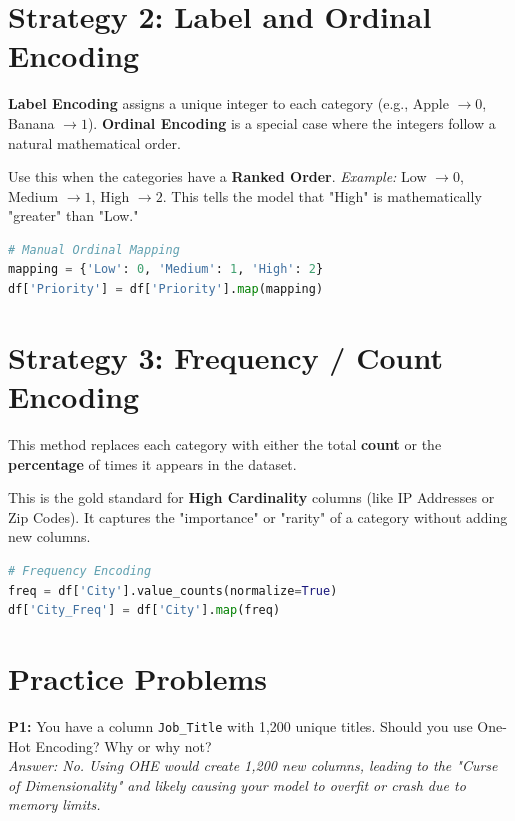 \documentclass{article}
\begin{document}
\section{Strategy 2: Label and Ordinal Encoding}
\textbf{Label Encoding} assigns a unique integer to each category (e.g., Apple $\to 0$, Banana $\to 1$). 
\textbf{Ordinal Encoding} is a special case where the integers follow a natural mathematical order.

\begin{tcolorbox}[colback=green!5!white,colframe=green!75!black,title=When to use Ordinal]
Use this when the categories have a \textbf{Ranked Order}. 
\textit{Example:} Low $\to 0$, Medium $\to 1$, High $\to 2$.
This tells the model that "High" is mathematically "greater" than "Low."
\end{tcolorbox}

\begin{lstlisting}[language=Python]
# Manual Ordinal Mapping
mapping = {'Low': 0, 'Medium': 1, 'High': 2}
df['Priority'] = df['Priority'].map(mapping)
\end{lstlisting}

\section{Strategy 3: Frequency / Count Encoding}
This method replaces each category with either the total \textbf{count} or the \textbf{percentage} of times it appears in the dataset.

\begin{tcolorbox}[colback=orange!5!white,colframe=orange!75!black,title=When to use Frequency]
This is the gold standard for \textbf{High Cardinality} columns (like IP Addresses or Zip Codes). It captures the "importance" or "rarity" of a category without adding new columns.
\end{tcolorbox}

\begin{lstlisting}[language=Python]
# Frequency Encoding
freq = df['City'].value_counts(normalize=True)
df['City_Freq'] = df['City'].map(freq)
\end{lstlisting}

\section{Practice Problems}
\textbf{P1:} You have a column \texttt{Job\_Title} with 1,200 unique titles. Should you use One-Hot Encoding? Why or why not? \\
\textit{Answer: No. Using OHE would create 1,200 new columns, leading to the "Curse of Dimensionality" and likely causing your model to overfit or crash due to memory limits.}
\end{document}
